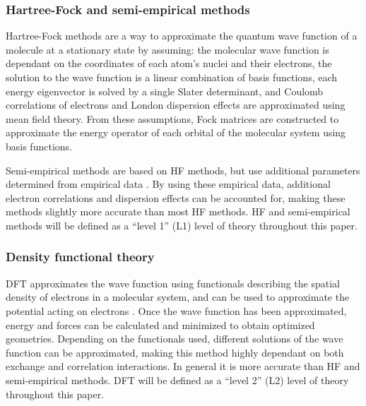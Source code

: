 \documentclass[preprint, 11pt]{elsarticle} %
\begin{document}
\subsubsection{Hartree-Fock and semi-empirical methods}

Hartree-Fock methods are a way to approximate the quantum wave function of a molecule at a stationary state \cite{HF:1951, HF:1987} by assuming: the molecular wave function is dependant on the coordinates of each atom's nuclei and their electrons, the solution to the wave function is a linear combination of basis functions, each energy eigenvector is solved by a single Slater determinant, and Coulomb correlations of electrons and London dispersion effects are approximated using mean field theory.
From these assumptions, Fock matrices are constructed to approximate the energy operator of each orbital of the molecular system using basis functions.

Semi-empirical methods are based on HF methods, but use additional parameters determined from empirical data \cite{SEMethods:2014}. 
By using these empirical data, additional electron correlations and dispersion effects can be accounted for, making these methods slightly more accurate than most HF methods.
HF and semi-empirical methods will be defined as a ``level 1'' (L1) level of theory throughout this paper. 

\subsubsection{Density functional theory}

DFT approximates the wave function using functionals describing the spatial density of electrons in a molecular system, and can be used to approximate the potential acting on electrons \cite{DFT:1964,dft:1994}.
Once the wave function has been approximated, energy and forces can be calculated and minimized to obtain optimized geometries.
Depending on the functionals used, different solutions of the wave function can be approximated, making this method highly dependant on both exchange and correlation interactions. 
In general it is more accurate than HF and semi-empirical methods.
DFT will be defined as a ``level 2'' (L2) level of theory throughout this paper.
\end{document}
